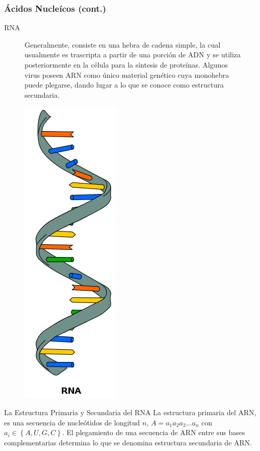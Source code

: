     \begin{frame}\frametitle{\textbf{Ácidos Nucleícos (cont.)}}
      \begin{block}{RNA}
        \begin{figure}[h]
          \begin{minipage}{0.7 \textwidth} 
            Generalmente, consiste en una hebra de cadena simple, la cual usualmente es trascripta a partir de una porci\'on de ADN y se utiliza posteriormente en la c\'elula para la s\'intesis de prote\'inas. Algunos virus poseen ARN como \'unico material gen\'etico cuya monohebra puede plegarse, dando lugar a lo que se conoce como estructura secundaria.
          \end{minipage}
          \begin{minipage}{3cm}
          \begin{center}
           \includegraphics[scale=.15]{images/rna.png}
          \end{center}
          \end{minipage}
        \end{figure}
      \end{block}

      \begin{block}{La Estructura Primaria y Secundaria del RNA}
        La estructura primaria del ARN, es una secuencia de nucle\'otidos de longitud $n$, $A=a_{1}a_{2}a_{3}\dots a_{n}$ con $a_{i} \in \left\lbrace A, U, G, C \right\rbrace$. El plegamiento de una secuencia de ARN entre sus bases complementarias determina lo que se denomina estructura secundaria de ARN.
      \end{block}
    \end{frame}

